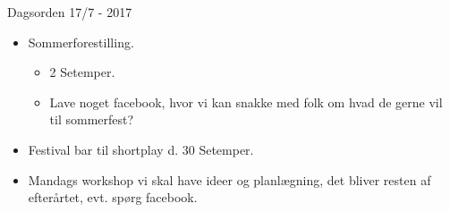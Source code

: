 \documentclass[12pt, a4paper]{article}
\begin{document}
\begin{center}
  {\LARGE Dagsorden 17/7 - 2017}
\end{center}

\begin{itemize}
  \item Sommerforestilling.
  \begin{itemize}
    \item 2 Setemper.
    \item Lave noget facebook, hvor vi kan snakke med folk om hvad de gerne vil til sommerfest?
  \end{itemize}
  \item Festival bar til shortplay d. 30 Setemper.
  \item Mandags workshop vi skal have ideer og planlægning, det bliver resten af efterårtet, evt. spørg facebook.
\end{itemize}
\end{document}
